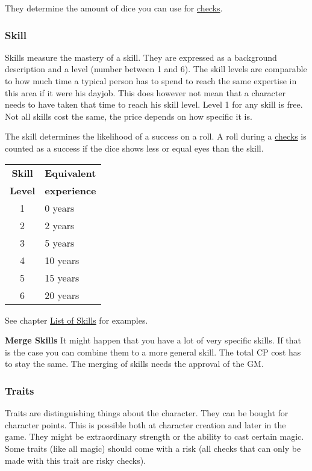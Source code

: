 \documentclass[11pt]{article}
\begin{document}
{\begin{multicols}{2}[]
They determine the amount of dice you can use for \hyperref[sec:org0f646d2]{checks}. 

\subsubsection{Skill}
\label{sec:org3231184}

Skills measure the mastery of a skill. They are expressed as a background description and a level (number between 1 and 6). The skill levels are comparable to how much time a typical person has to spend to reach the same expertise in this area if it were his dayjob. This does however not mean that a character needs to have taken that time to reach his skill level. Level 1 for any skill is free. Not all skills cost the same, the price depends on how specific it is.

The skill determines the likelihood of a success on a roll. A roll during a \hyperref[sec:org0f646d2]{checks} is counted as a success if the dice shows less or equal eyes than the skill.


\begin{center}
\begin{tabular}{c|l}
\textbf{Skill} & \textbf{Equivalent}\\
\textbf{Level} & \textbf{experience}\\
\hline
1 & 0 years\\
2 & 2 years\\
3 & 5 years\\
4 & 10 years\\
5 & 15 years\\
6 & 20 years\\
\end{tabular}
\end{center}

See chapter \hyperref[sec:org65e8527]{List of Skills} for examples.

\textbf{Merge Skills}
It might happen that you have a lot of very specific skills. If that is the case you can combine them to a more general skill. The total CP cost has to stay the same. The merging of skills needs the approval of the GM.

\subsubsection{Traits}
\label{sec:org7bf354f}
Traits are distinguishing things about the character. They can be bought for character points. This is possible both at character creation and later in the game.
They might be extraordinary strength or the ability to cast certain magic. Some traits (like all magic) should come with a risk (all checks that can only be made with this trait are risky checks).


\end{multicols}}
\end{document}
